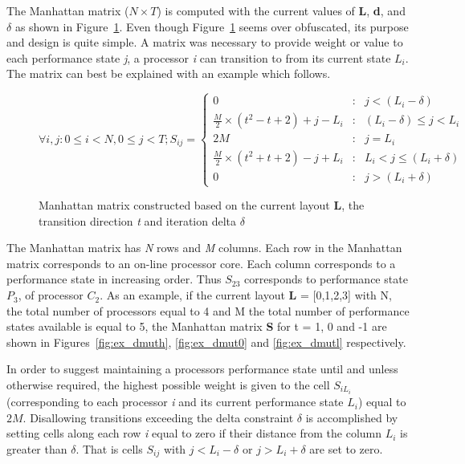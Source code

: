 The Manhattan matrix ($N \times T$) is computed with the current values of \textbf{L}, \textbf{d}, and 
$\delta$ as shown in Figure~\ref{fig:delta_mat}. Even though Figure~\ref{fig:delta_mat} seems over 
obfuscated, its purpose and design is quite simple. A matrix was necessary to provide weight or value
to each performance state \textit{j}, a processor \textit{i} can transition to from its current state $L_i$. The
matrix can best be explained with an example which follows.

\begin{figure}[h!]
\centering
\begin{equation*}
    \forall i,j: 0 \leq i < N, 0 \leq j < T; S_{ij} = \left\{
     \begin{array}{lcr}
       0 & : & j < (L_{i} - \delta) \\
       \frac{M}{2} \times (t^{2} - t + 2) + j - L_{i} & : & (L_{i} - \delta) \leq j < L_{i} \\
       2M & : & j = L_{i}\\
       \frac{M}{2} \times (t^{2} + t + 2) - j + L_{i} & : & L_{i} < j \leq (L_{i} + \delta) \\
       0 & : & j > (L_{i} + \delta)
     \end{array}
   \right.
\end{equation*}
\caption{Manhattan matrix constructed based on the current layout \textbf{L}, 
the transition direction \textit{t} and iteration delta $\delta$}
\label{fig:delta_mat}
\end{figure}

The Manhattan matrix has \textit{N} rows and \textit{M} columns. Each row in the Manhattan
matrix corresponds to an on-line processor core. Each column corresponds to a performance state
in increasing order. Thus $S_{23}$ corresponds to performance state $P_3$, of processor $C_2$. 
As an example, if the current layout \textbf{L} = [0,1,2,3] with N, the total number of processors equal to 4 
and M the total number of performance states available is equal to 5,
the Manhattan matrix \textbf{S} for t = 1, 0 and -1 are shown in Figures~\ref{fig:ex_dmuth}, 
\ref{fig:ex_dmut0} and \ref{fig:ex_dmutl} respectively. 

In order to suggest maintaining a processors performance state until and unless otherwise required,
the highest possible weight is given to the cell $S_{iL_i}$ (corresponding to each processor \textit{i}
and its current performance state $L_i$) equal to $2M$. Disallowing transitions exceeding the delta 
constraint $\delta$ is accomplished by setting cells along each row \textit{i} equal to zero if their distance 
from the column $L_i$ is greater than $\delta$. That is cells $S_{ij}$ with $j < L_i - \delta$ or $j > L_i + \delta$
are set to zero.

